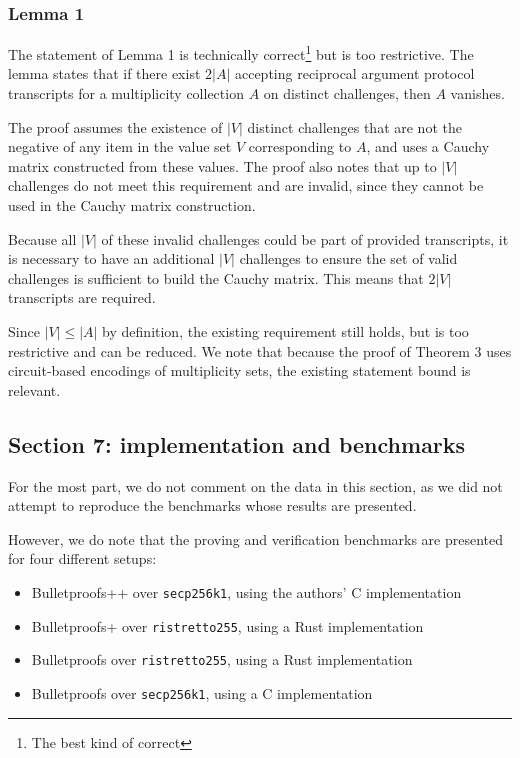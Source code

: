 \documentclass{article}
\begin{document}
\subsubsection{Lemma 1}

The statement of Lemma 1 is technically correct\footnote{The best kind of correct} but is too restrictive.
The lemma states that if there exist $2|A|$ accepting reciprocal argument protocol transcripts for a multiplicity collection $A$ on distinct challenges, then $A$ vanishes.

The proof assumes the existence of $|V|$ distinct challenges that are not the negative of any item in the value set $V$ corresponding to $A$, and uses a Cauchy matrix constructed from these values.
The proof also notes that up to $|V|$ challenges do not meet this requirement and are invalid, since they cannot be used in the Cauchy matrix construction.

Because all $|V|$ of these invalid challenges could be part of provided transcripts, it is necessary to have an additional $|V|$ challenges to ensure the set of valid challenges is sufficient to build the Cauchy matrix.
This means that $2|V|$ transcripts are required.

Since $|V| \leq |A|$ by definition, the existing requirement still holds, but is too restrictive and can be reduced.
We note that because the proof of Theorem 3 uses circuit-based encodings of multiplicity sets, the existing statement bound is relevant.


\subsection{Section 7: implementation and benchmarks}

For the most part, we do not comment on the data in this section, as we did not attempt to reproduce the benchmarks whose results are presented.

However, we do note that the proving and verification benchmarks are presented for four different setups:
\begin{itemize}
	\item Bulletproofs++ over \texttt{secp256k1}, using the authors' C implementation
	\item Bulletproofs+ over \texttt{ristretto255}, using a Rust implementation
	\item Bulletproofs over \texttt{ristretto255}, using a Rust implementation
	\item Bulletproofs over \texttt{secp256k1}, using a C implementation
\end{itemize}
\end{document}
